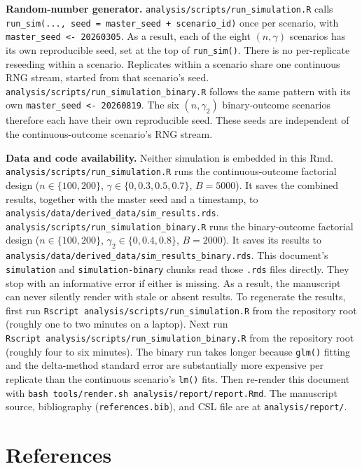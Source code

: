\documentclass[
  11pt,
]{article}
\begin{document}
\textbf{Random-number generator.}
\texttt{analysis/scripts/run\_simulation.R} calls \texttt{run\_sim(...,\ seed\ =\ master\_seed\ +\ scenario\_id)} once per scenario, with
\texttt{master\_seed\ \textless{}-\ 20260305}. As a result, each of the
eight \((n, \gamma)\) scenarios has its own reproducible
seed, set at the top of \texttt{run\_sim()}. There is no
per-replicate reseeding within a scenario. Replicates
within a scenario share one continuous RNG stream,
started from that scenario's seed.
\texttt{analysis/scripts/run\_simulation\_binary.R} follows the
same pattern with its own \texttt{master\_seed\ \textless{}-\ 20260819}. The
six \((n, \gamma_2)\) binary-outcome scenarios therefore
each have their own reproducible seed. These seeds are
independent of the continuous-outcome scenario's RNG
stream.

\textbf{Data and code availability.} Neither simulation is
embedded in this Rmd.
\texttt{analysis/scripts/run\_simulation.R} runs the
continuous-outcome factorial design
(\(n \in \{100, 200\}\), \(\gamma \in \{0, 0.3, 0.5, 0.7\}\),
\(B = 5000\)). It saves the combined results, together
with the master seed and a timestamp, to
\texttt{analysis/data/derived\_data/sim\_results.rds}.
\texttt{analysis/scripts/run\_simulation\_binary.R} runs the
binary-outcome factorial design (\(n \in \{100, 200\}\),
\(\gamma_2 \in \{0, 0.4, 0.8\}\), \(B = 2000\)). It saves
its results to
\texttt{analysis/data/derived\_data/sim\_results\_binary.rds}.
This document's \texttt{simulation} and \texttt{simulation-binary}
chunks read those \texttt{.rds} files directly. They stop with
an informative error if either is missing. As a result,
the manuscript can never silently render with stale or
absent results. To regenerate the results, first run
\texttt{Rscript\ analysis/scripts/run\_simulation.R} from the
repository root (roughly one to two minutes on a
laptop). Next run
\texttt{Rscript\ analysis/scripts/run\_simulation\_binary.R}
from the repository root (roughly four to six minutes).
The binary run takes longer because \texttt{glm()} fitting and
the delta-method standard error are substantially more
expensive per replicate than the continuous scenario's
\texttt{lm()} fits. Then re-render this document with
\texttt{bash\ tools/render.sh\ analysis/report/report.Rmd}. The
manuscript source, bibliography (\texttt{references.bib}), and
CSL file are at \texttt{analysis/report/}.

\section{References}\label{references}
\end{document}
